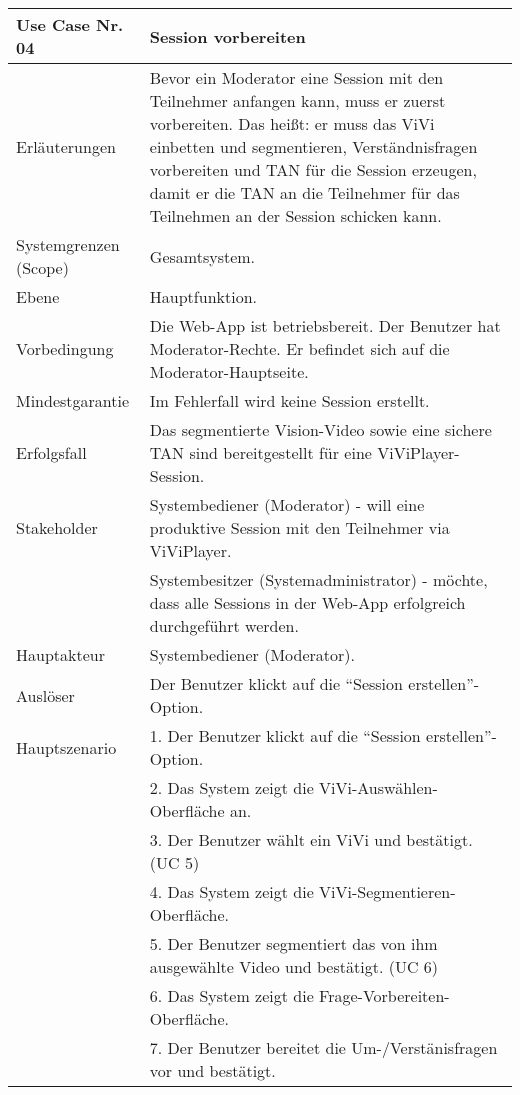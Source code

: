 \begin{tabularx}{\linewidth}{|l|X|}
	\hline
	Use Case Nr. 04			& \textbf{Session vorbereiten} \\ \hline
	Erläuterungen			& Bevor ein Moderator eine Session mit den Teilnehmer anfangen 
	                          kann, muss er zuerst vorbereiten. Das heißt: er muss das ViVi einbetten und segmentieren, Verständnisfragen vorbereiten und TAN für die Session erzeugen, damit er die TAN an die Teilnehmer für das Teilnehmen an der Session schicken kann. \\ \hline
	Systemgrenzen (Scope)	& Gesamtsystem. \\ \hline
	Ebene					& Hauptfunktion. \\ \hline
	Vorbedingung			& Die Web-App ist betriebsbereit. Der Benutzer hat 
	                          Moderator-Rechte. Er befindet sich auf die Moderator-Hauptseite. \\ \hline
	Mindestgarantie			& Im Fehlerfall wird keine Session erstellt.\\ \hline
	Erfolgsfall  			& Das segmentierte Vision-Video sowie eine sichere TAN sind 
	                          bereitgestellt für eine ViViPlayer-Session. \\ \hline
	Stakeholder				& Systembediener (Moderator) - will eine produktive Session mit den 
	                          Teilnehmer via ViViPlayer. \\
							& Systembesitzer (Systemadministrator) - möchte, dass alle Sessions 
							  in der Web-App erfolgreich durchgeführt werden. \\ \hline
	Hauptakteur				& Systembediener (Moderator). \\ \hline
	Auslöser				& Der Benutzer klickt auf die ``Session erstellen''-Option. \\ \hline	
	Hauptszenario			& 1. Der Benutzer klickt auf die ``Session erstellen''-Option. \\ 
							& 2. Das System zeigt die ViVi-Auswählen-Oberfläche an. \\
							& 3. Der Benutzer wählt ein ViVi und bestätigt. (UC 5) \\ 
							& 4. Das System zeigt die ViVi-Segmentieren-Oberfläche. \\ 
							& 5. Der Benutzer segmentiert das von ihm ausgewählte Video und 
							  bestätigt. (UC 6) \\
							& 6. Das System zeigt die Frage-Vorbereiten-Oberfläche. \\
							& 7. Der Benutzer bereitet die Um-/Verstänisfragen vor und bestätigt.

\end{tabularx}
